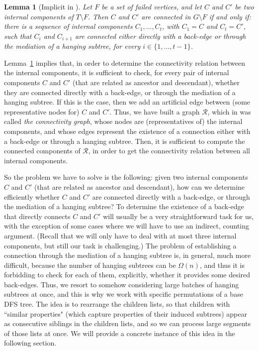 \documentclass[11pt,a4paper]{article}
\newtheorem{lemma}[theorem]{Lemma}
\begin{document}
\begin{lemma}[Implicit in \cite{DBLP:conf/esa/Kosinas23}]
\label{lemma:basic}
Let $F$ be a set of failed vertices, and let $C$ and $C'$ be two internal components of $T\setminus F$. Then $C$ and $C'$ are connected in $G\setminus F$ if and only if:  there is a sequence of internal components $C_1,\dots,C_t$, with $C_1=C$ and $C_t=C'$, such that $C_i$ and $C_{i+1}$ are connected either directly with a back-edge or through the mediation of a hanging subtree, for every $i\in\{1,\dots,t-1\}$.
\end{lemma} 

Lemma~\ref{lemma:basic} implies that, in order to determine the connectivity relation between the internal components, it is sufficient to check, for every pair of internal components $C$ and $C'$ (that are related as ancestor and descendant), whether they are connected directly with a back-edge, or through the mediation of a hanging subtree. If this is the case, then we add an artificial edge between (some representative nodes for) $C$ and $C'$. Thus, we have built a graph $\mathcal{R}$, which in \cite{DBLP:conf/esa/Kosinas23} was called \emph{the connectivity graph}, whose nodes are (representatives of) the internal components, and whose edges represent the existence of a connection either with a back-edge or through a hanging subtree. Then, it is sufficient to compute the connected components of $\mathcal{R}$, in order to get the connectivity relation between all internal components.

So the problem we have to solve is the following: given two internal components $C$ and $C'$ (that are related as ancestor and descendant), how can we determine efficiently whether $C$ and $C'$ are connected directly with a back-edge, or through the mediation of a hanging subtree? To determine the existence of a back-edge that directly connects $C$ and $C'$ will usually be a very straightforward task for us, with the exception of some cases where we will have to use an indirect, counting argument. (Recall that we will only have to deal with at most three internal components, but still our task is challenging.) The problem of establishing a connection through the mediation of a hanging subtree is, in general, much more difficult, because the number of hanging subtrees can be $\Omega(n)$, and thus it is forbidding to check for each of them, explicitly, whether it provides some desired back-edges. Thus, we resort to somehow considering large batches of hanging subtrees at once, and this is why we work with specific permutations of a base DFS tree. The idea is to rearrange the children lists, so that children with ``similar properties" (which capture properties of their induced subtrees) appear as consecutive siblings in the children lists, and so we can process large segments of those lists at once. We will provide a concrete instance of this idea in the following section.
\end{document}
